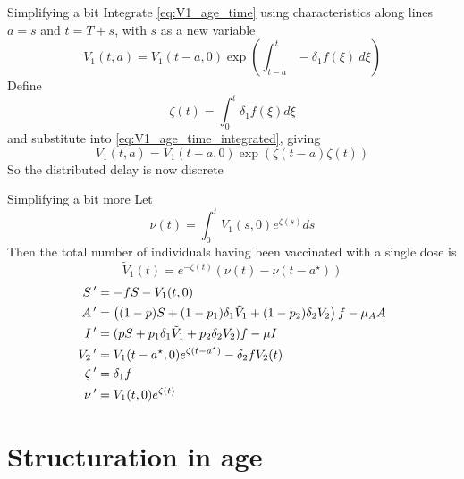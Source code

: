 \documentclass[aspectratio=169]{beamer}\usepackage[]{graphicx}\usepackage[]{xcolor}
\begin{document}
\begin{frame}{Simplifying a bit}
Integrate \eqref{eq:V1_age_time} using characteristics along lines $a=s$ and $t=T+s$, with $s$ as a new variable
\begin{equation}\label{eq:V1_age_time_integrated}
V_1(t,a)=V_1(t-a,0)\exp\left(\int_{t-a}^t -\delta_1f(\xi)\ d\xi\right)
\end{equation}
Define
\[
\zeta(t)=\int_0^t\delta_1f(\xi)d\xi
\]
and substitute into \eqref{eq:V1_age_time_integrated}, giving
\[
V_1(t,a)=V_1(t-a,0)\exp\left(\zeta(t-a)\zeta(t)\right)
\]
So the distributed delay is now discrete
\end{frame}

\begin{frame}{Simplifying a bit more}
Let
\[
\nu(t)=\int_0^t V_1(s,0)e^{\zeta(s)}ds
\]
Then the total number of individuals having been vaccinated with a single dose is
\[
\tilde V_1(t)=e^{-\zeta(t)}
\left(
\nu(t)-\nu(t-a^\star)
\right)
\]
\begin{subequations}
\begin{align}
S\,' &= -fS-V_1(t,0) \\
A\,' &= \left(
(1-p)S+(1-p_1)\delta_1\tilde V_1+(1-p_2)\delta_2 V_2
\right)f-\mu_AA \\
I\,' &= (pS+p_1\delta_1\tilde V_1+p_2\delta_2 V_2)f-\mu I \\
V_2\,' &= V_1(t-a^\star,0)e^{\zeta(t-a^\star)}-\delta_2fV_2(t) \\
\zeta\,' &= \delta_1f \\
\nu\,' &= V_1(t,0)e^{\zeta(t)}
\end{align}
\end{subequations}
\end{frame}


\section{Structuration in age}

% 
\end{document}
